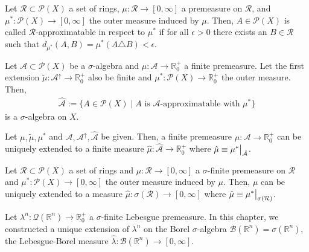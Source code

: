 \begin{definition}
    Let \(\mathcal{R} \subset \mathcal{P}(X)\) a set of rings, \(\mu: \mathcal{R} \rightarrow [0, \infty]\) a premeasure on \(\mathcal{R}\), and \(\mu^*: \mathcal{P}(X) \rightarrow [0, \infty]\) the outer measure induced by \(\mu\). Then, \(A \in \mathcal{P}(X)\) is called \(\mathcal{R}\)-approximatable in respect to \(\mu^*\) if for all \(\epsilon > 0\) there exists an \(B \in \mathcal{R}\) such that \(d_{\mu^*}(A, B) = \mu^*(A \triangle B) < \epsilon\).
\end{definition}

\begin{theorem}
    Let \(\mathcal{A} \subset \mathcal{P}(X)\) be a \(\sigma\)-algebra and \(\mu: \mathcal{A} \rightarrow \mathbb{R}_0^+\) a finite premeasure. Let the first extension \(\tilde{\mu}: \mathcal{A}^\uparrow \rightarrow \mathbb{R}_0^+\) also be finite and \(\mu^*: \mathcal{P}(X) \rightarrow \mathbb{R}_0^+\) the outer measure. Then,
    \begin{align}
        \hat{\mathcal{A}} := \{ A \in \mathcal{P}(X) \mid \text{\(A\) is \(\mathcal{A}\)-approximatable with \(\mu^*\)} \}
    \end{align}
    is a \(\sigma\)-algebra on \(X\).
\end{theorem}

\begin{theorem}
    Let \(\mu, \tilde{\mu}, \mu^*\) and \(\mathcal{A}, \mathcal{A}^\uparrow, \hat{\mathcal{A}}\) be given. Then, a finite premeasure \(\mu: \mathcal{A} \rightarrow \mathbb{R}_0^+\) can be uniquely extended to a finite measure \(\hat{\mu}: \hat{\mathcal{A}} \rightarrow \mathbb{R}_0^+\) where \(\hat{\mu} \equiv \restr{\mu^*}{\hat{\mathcal{A}}}\).
\end{theorem}

\begin{theorem}
    Let \(\mathcal{R} \subset \mathcal{P}(X)\) a set of rings and \(\mu: \mathcal{R} \rightarrow [0, \infty]\) a \(\sigma\)-finite premeasure on \(\mathcal{R}\) and \(\mu^*: \mathcal{P}(X) \rightarrow [0, \infty]\) the outer measure induced by \(\mu\). Then, \(\mu\) can be uniquely extended to a measure \(\hat{\mu}: \sigma(\mathcal{R}) \rightarrow [0, \infty]\) where \(\hat{\mu} \equiv \restr{\mu^*}{\sigma(\mathcal{R})}\).
\end{theorem}

\begin{definition}
    Let \(\lambda^n: \mathcal{Q}(\mathbb{R}^n) \rightarrow \mathbb{R}_0^+\) a \(\sigma\)-finite Lebesgue premeasure. In this chapter, we constructed a unique extension of \(\lambda^n\) on the Borel \(\sigma\)-algebra \(\mathcal{B}(\mathbb{R}^n) = \sigma(\mathbb{R}^n)\), the Lebesgue-Borel measure \(\hat{\lambda}: \mathcal{B}(\mathbb{R}^n) \rightarrow [0, \infty]\).
\end{definition}